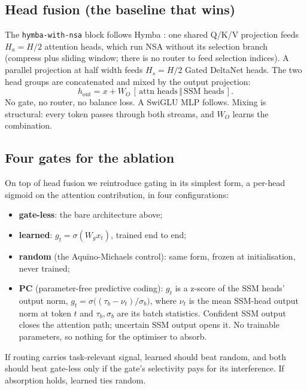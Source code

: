 \documentclass[11pt,a4paper]{article}
\begin{document}
\subsection{Head fusion (the baseline that wins)}
\label{sec:setup-head}

The \texttt{hymba-with-nsa} block follows Hymba \citep{hymba}: one shared
Q/K/V projection feeds $H_a = H/2$ attention heads, which run NSA without
its selection branch (compress plus sliding window; there is no router to
feed selection indices). A parallel projection at half width feeds
$H_s = H/2$ Gated DeltaNet heads. The two head groups are concatenated
and mixed by the output projection:
\[
  h_{\text{out}} = x + W_O\,[\,\text{attn heads} \,\Vert\, \text{SSM heads}\,].
\]
No gate, no router, no balance loss. A SwiGLU MLP follows. Mixing is
structural: every token passes through both streams, and $W_O$ learns the
combination.

\subsection{Four gates for the ablation}
\label{sec:setup-gates}

On top of head fusion we reintroduce gating in its simplest form, a
per-head sigmoid on the attention contribution, in four configurations:

\begin{itemize}
\item \textbf{gate-less}: the bare architecture above;
\item \textbf{learned}: $g_t = \sigma(W_g x_t)$, trained end to end;
\item \textbf{random} (the Aquino-Michaels control): same form, frozen at
      initialisation, never trained;
\item \textbf{PC} (parameter-free predictive coding): $g_t$ is a z-score
      of the SSM heads' output norm,
      $g_t = \sigma\!\big((\tau_b - \nu_t)/\sigma_b\big)$, where $\nu_t$ is
      the mean SSM-head output norm at token $t$ and $\tau_b, \sigma_b$
      are its batch statistics. Confident SSM output closes the attention
      path; uncertain SSM output opens it. No trainable parameters, so
      nothing for the optimiser to absorb.
\end{itemize}

If routing carries task-relevant signal, learned should beat random, and
both should beat gate-less only if the gate's selectivity pays for its
interference. If absorption holds, learned ties random.
\end{document}
